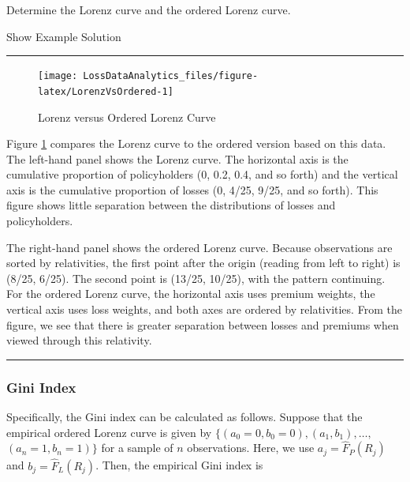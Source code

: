\documentclass[]{book}
\theoremstyle{definition}
\theoremstyle{definition}
\theoremstyle{definition}
\theoremstyle{remark}
\begin{document}
Determine the Lorenz curve and the ordered Lorenz curve.

Show Example Solution

\hypertarget{toggleLorenz}{}
\begin{center}\rule{0.5\linewidth}{\linethickness}\end{center}

\begin{figure}

{\centering \texttt{[image: LossDataAnalytics\_files/figure-latex/LorenzVsOrdered-1]} 

}

\caption{Lorenz versus Ordered Lorenz Curve}\label{fig:LorenzVsOrdered}
\end{figure}

Figure \ref{fig:LorenzVsOrdered} compares the Lorenz curve to the
ordered version based on this data. The left-hand panel shows the Lorenz
curve. The horizontal axis is the cumulative proportion of policyholders
(0, 0.2, 0.4, and so forth) and the vertical axis is the cumulative
proportion of losses (0, 4/25, 9/25, and so forth). This figure shows
little separation between the distributions of losses and policyholders.

The right-hand panel shows the ordered Lorenz curve. Because
observations are sorted by relativities, the first point after the
origin (reading from left to right) is (8/25, 6/25). The second point is
(13/25, 10/25), with the pattern continuing. For the ordered Lorenz
curve, the horizontal axis uses premium weights, the vertical axis uses
loss weights, and both axes are ordered by relativities. From the
figure, we see that there is greater separation between losses and
premiums when viewed through this relativity.

\begin{center}\rule{0.5\linewidth}{\linethickness}\end{center}

\subsubsection*{Gini Index}\label{gini-index}

Specifically, the Gini index can be calculated as follows. Suppose that
the empirical ordered Lorenz curve is given by
\(\{ (a_0=0, b_0=0), (a_1, b_1), \ldots,\) \((a_n=1, b_n=1) \}\) for a
sample of \(n\) observations. Here, we use \(a_j = \hat{F}_P(R_j)\) and
\(b_j = \hat{F}_{L}(R_j)\). Then, the empirical Gini index is
\end{document}
